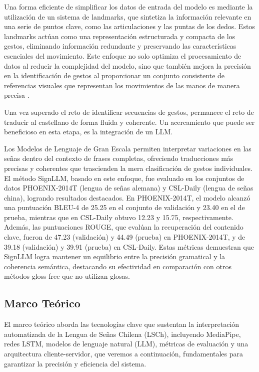 \documentclass[10pt]{article}
\begin{document}
\vspace{1\baselineskip}
Una forma eficiente de simplificar los datos de entrada del modelo es mediante la utilización de un sistema de landmarks, que sintetiza la información relevante en una serie de puntos clave, como las articulaciones y las puntas de los dedos. Estos landmarks actúan como una representación estructurada y compacta de los gestos, eliminando información redundante y preservando las características esenciales del movimiento. Este enfoque no solo optimiza el procesamiento de datos al reducir la complejidad del modelo, sino que también mejora la precisión en la identificación de gestos al proporcionar un conjunto consistente de referencias visuales que representan los movimientos de las manos de manera precisa .

\vspace{1\baselineskip}
Una vez superado el reto de identificar secuencias de gestos, permanece el reto de traducir al castellano de forma fluida y coherente. Un acercamiento que puede ser beneficioso en esta etapa, es la integración de un LLM. 

\vspace{1\baselineskip}
Los Modelos de Lenguaje de Gran Escala permiten interpretar variaciones en las señas dentro del contexto de frases completas, ofreciendo traducciones más precisas y coherentes que trascienden la mera clasificación de gestos individuales. El método SignLLM, basado en este enfoque, fue evaluado en los conjuntos de datos PHOENIX-2014T (lengua de señas alemana) y CSL-Daily (lengua de señas china), logrando resultados destacados. En PHOENIX-2014T, el modelo alcanzó una puntuación BLEU-4 de 25.25 en el conjunto de validación y 23.40 en el de prueba, mientras que en CSL-Daily obtuvo 12.23 y 15.75, respectivamente. Además, las puntuaciones ROUGE, que evalúan la recuperación del contenido clave, fueron de 47.23 (validación) y 44.49 (prueba) en PHOENIX-2014T, y de 39.18 (validación) y 39.91 (prueba) en CSL-Daily. Estas métricas demuestran que SignLLM logra mantener un equilibrio entre la precisión gramatical y la coherencia semántica, destacando su efectividad en comparación con otros métodos gloss-free que no utilizan glosas.

\subsection{Marco Teórico}

El marco teórico aborda las tecnologías clave que sustentan la interpretación automatizada de la Lengua de Señas Chilena (LSCh), incluyendo MediaPipe, redes LSTM, modelos de lenguaje natural (LLM), métricas de evaluación y una arquitectura cliente-servidor, que veremos a continuación, fundamentales para garantizar la precisión y eficiencia del sistema.
\end{document}

